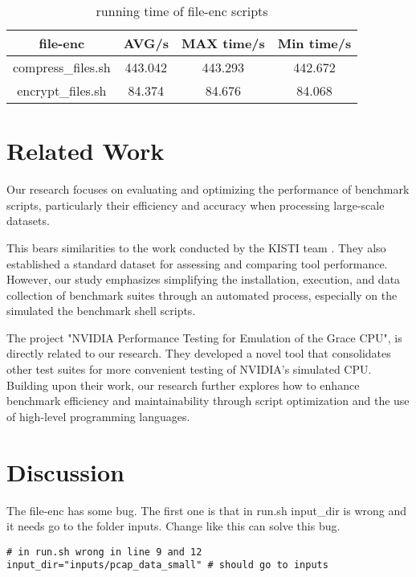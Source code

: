 \documentclass[sigplan, screen, 10pt]{acmart}
\begin{document}
\begin{table}[]
    \centering
    \begin{tabular}{c|c|c|c}
        \textbf{file-enc}& \textbf{AVG/s} & \textbf{MAX time/s} & \textbf{Min time/s} \\
         \hline
         compress_files.sh & 443.042 & 443.293 & 442.672 \\
         encrypt_files.sh & 84.374 & 84.676 & 84.068 \\
         \hline
    \end{tabular}
    \caption{running time of file-enc scripts}
\end{table}

\section{Related Work}
\label{related}
Our research focuses on evaluating and optimizing the performance of benchmark scripts, particularly their efficiency and accuracy when processing large-scale datasets.\par
This bears similarities to the work conducted by the KISTI team \cite{kim2015webshark}.   
They also established a standard dataset for assessing and comparing tool performance.
However, our study emphasizes simplifying the installation, execution, and data collection of benchmark suites through an automated process, especially on the simulated the benchmark shell scripts.\par
The project "NVIDIA Performance Testing for Emulation of the Grace CPU"\cite{fan2021nvidia}, is directly related to our research.
They developed a novel tool that consolidates other test suites for more convenient testing of NVIDIA's simulated CPU. 
Building upon their work, our research further explores how to enhance benchmark efficiency and maintainability through script optimization and the use of high-level programming languages.\newline

\section{Discussion}
\label{dis}

The file-enc has some bug.
The first one is that in run.sh input\_dir is wrong and it needs go to the folder inputs.
Change like this can solve this bug.
\begin{verbatim}
# in run.sh wrong in line 9 and 12
input_dir="inputs/pcap_data_small" # should go to inputs
\end{verbatim}
\end{document}
